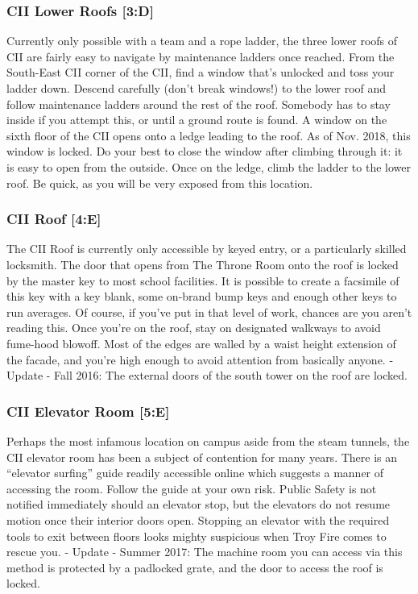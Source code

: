 \documentclass{article}
\begin{document}
\subsubsection{CII Lower Roofs [3:D]}
Currently only possible with a team and a rope ladder, the three lower roofs of CII are fairly easy to navigate by maintenance ladders once reached. From the South-East CII corner of the CII, find a window that’s unlocked and toss your ladder down. Descend carefully (don’t break windows!) to the lower roof and follow maintenance ladders around the rest of the roof. Somebody has to stay inside if you attempt this, or until a ground route is found.
A window on the sixth floor of the CII opens onto a ledge leading to the roof. As of Nov. 2018, this window is locked. Do your best to close the window after climbing through it: it is easy to open from the outside. Once on the ledge, climb the ladder to the lower roof. Be quick, as you will be very exposed from this location.

 \subsubsection{CII Roof [4:E]}
The CII Roof is currently only accessible by keyed entry, or a particularly skilled locksmith. The door that opens from The Throne Room onto the roof is locked by the master key to most school facilities. It is possible to create a facsimile of this key with a key blank, some on-brand bump keys and enough other keys to run averages. Of course, if you’ve put in that level of work, chances are you aren’t reading this. Once you’re on the roof, stay on designated walkways to avoid fume-hood blowoff. Most of the edges are walled by a waist height extension of the facade, and you’re high enough to avoid attention from basically anyone.
- Update - Fall 2016: The external doors of the south tower on the roof are locked.
\subsubsection{CII Elevator Room [5:E]}
Perhaps the most infamous location on campus aside from the steam tunnels, the CII elevator room has been a subject of contention for many years. There is an “elevator surfing” guide readily accessible online which suggests a manner of accessing the room. Follow the guide at your own risk. Public Safety is not notified immediately should an elevator stop, but the elevators do not resume motion once their interior doors open. Stopping an elevator with the required tools to exit between floors looks mighty suspicious when Troy Fire comes to rescue you.
- Update - Summer 2017: The machine room you can access via this method is protected by a padlocked grate, and the door to access the roof is locked.
\end{document}
